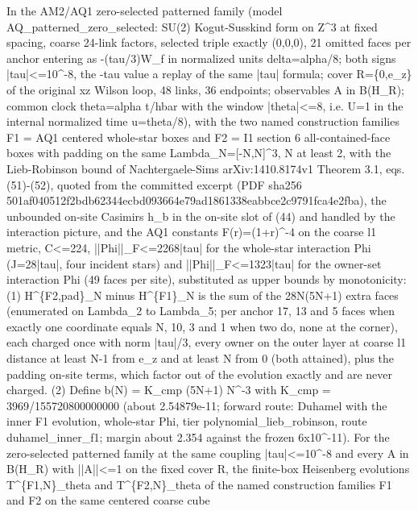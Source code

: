 \begin{gatequote}
In the AM2/AQ1 zero-selected patterned family (model
AQ\_patterned\_zero\_selected: SU(2) Kogut-Susskind form on
Z\textasciicircum{}3 at fixed spacing, coarse 24-link factors, selected triple
exactly (0,0,0), 21 omitted faces per anchor entering as -(tau/3)W\_f in
normalized units delta=alpha/8; both signs |tau|<=10\textasciicircum{}-8, the
-tau value a replay of the same |tau| formula; cover R=\{0,e\_z\} of the
original xz Wilson loop, 48 links, 36 endpoints; observables A in B(H\_R);
common clock theta=alpha t/hbar with the window |theta|<=8, i.e. U=1 in the
internal normalized time u=theta/8), with the two named construction families
F1 = AQ1 centered whole-star boxes and F2 = I1 section 6 all-contained-face
boxes with padding on the same Lambda\_N=[-N,N]\textasciicircum{}3, N at least
2, with the Lieb-Robinson bound of Nachtergaele-Sims arXiv:1410.8174v1 Theorem
3.1, eqs. (51)-(52), quoted from the committed excerpt (PDF sha256
501af040512f2bdb62344ecbd093664e79ad1861338eabbce2c9791fca4e2fba), the
unbounded on-site Casimirs h\_b in the on-site slot of (44) and handled by the
interaction picture, and the AQ1 constants F(r)=(1+r)\textasciicircum{}-4 on
the coarse l1 metric, C<=224, ||Phi||\_F<=2268|tau| for the whole-star
interaction Phi (J=28|tau|, four incident stars) and
||Phi\textquotesingle{}||\_F<=1323|tau| for the owner-set interaction
Phi\textquotesingle{} (49 faces per site), substituted as upper bounds by
monotonicity: (1) H\textasciicircum{}\{F2,pad\}\_N minus
H\textasciicircum{}\{F1\}\_N is the sum of the 28N(5N+1) extra faces
(enumerated on Lambda\_2 to Lambda\_5; per anchor 17, 13 and 5 faces when
exactly one coordinate equals N, 10, 3 and 1 when two do, none at the corner),
each charged once with norm |tau|/3, every owner on the outer layer at coarse
l1 distance at least N-1 from e\_z and at least N from 0 (both attained), plus
the padding on-site terms, which factor out of the evolution exactly and are
never charged. (2) Define b(N) = K\_cmp (5N+1) N\textasciicircum{}-3 with
K\_cmp = 3969/155720800000000 (about 2.54879e-11; forward route: Duhamel with
the inner F1 evolution, whole-star Phi, tier polynomial\_lieb\_robinson, route
duhamel\_inner\_f1; margin about 2.354 against the frozen
6x10\textasciicircum{}-11). For the zero-selected patterned family at the same
coupling |tau|<=10\textasciicircum{}-8 and every A in B(H\_R) with ||A||<=1 on
the fixed cover R, the finite-box Heisenberg evolutions
T\textasciicircum{}\{F1,N\}\_theta and T\textasciicircum{}\{F2,N\}\_theta of
the named construction families F1 and F2 on the same centered coarse cube

\end{gatequote}
